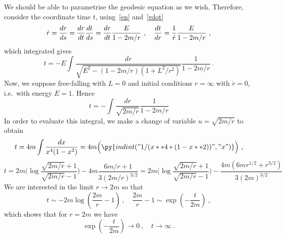     We should be able to parametrise the geodesic equation as we wish. Therefore, consider the coordinate time $t$, using~\eqref{en} and~\eqref{rdot}
    \begin{equation*}
        \dot r = \frac{dr}{ds} = \frac{dr}{dt} \frac{dt}{ds} = \frac{dr}{dt} \frac{E}{1 - 2m / r} ~, \quad \frac{dt}{dr} = \frac{1}{\dot r} \frac{E}{1 - 2m / r} ~,
    \end{equation*}
    which integrated gives
    \begin{equation*}
        t = - E \int \frac{dr}{\sqrt{E^2 - (1 - 2m/r)(1 + L^2 / r^2)}} \frac{1}{1 - 2m / r} ~.
    \end{equation*}
    Now, we suppose free-falling with $L = 0$ and initial conditions $r=\infty$ with $\dot r = 0$, i.e.~with energy $E = 1$. Hence
    \begin{equation*}
        t = - \int \frac{dr}{\sqrt{2m/r}} \frac{1}{1 - 2m / r}
    \end{equation*}
    In order to evaluate this integral, we make a change of variable $u = \sqrt{2m / r}$ to obtain 
    \begin{equation*}
        t = 4m \int \frac{dx}{x^4 (1 - x^2)} = 4m \Big ( \py{indint(" 1 / (x**4 * (1 - x**2) ) ", "x")} \Big ) ~,
    \end{equation*}
    \begin{equation*}
        t = 2m \Big ( \log \frac{\sqrt{2m / r} + 1}{\sqrt{2m / r} - 1} \Big ) - 4 m \frac{6m / r + 1 }{3 (2m / r)^{3/2}} = 2m \Big ( \log \frac{\sqrt{2m / r} + 1}{\sqrt{2m / r} - 1} \Big ) - \frac{4m (6 m r^{1/2} + r^{3/2})}{3 (2m)^{3/2}}  
    \end{equation*}
    We are interested in the limit $r \rightarrow 2m$ so that 
    \begin{equation*}
        t \sim - 2m \log (\frac{2m}{r} - 1) ~, \quad \frac{2m}{r} - 1 \sim \exp(- \frac{t}{2m}) ~,
    \end{equation*}
    which shows that for $r = 2m$ we have 
    \begin{equation*}
        \exp(- \frac{t}{2m}) \rightarrow 0 ~, \quad t \rightarrow \infty ~.
    \end{equation*}

